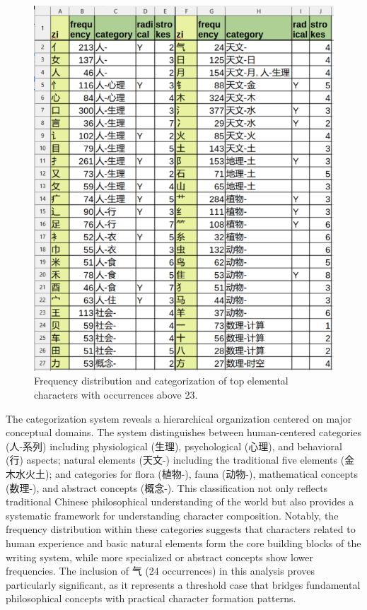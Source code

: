 \begin{figure}
\centering
\includegraphics{./images/top-elemental-zi-ENU.png}
\caption{Frequency distribution and categorization of top elemental
characters with occurrences above 23.}
\end{figure}

The categorization system reveals a hierarchical organization centered
on major conceptual domains. The system distinguishes between
human-centered categories (人-系列) including physiological (生理),
psychological (心理), and behavioral (行) aspects; natural elements
(天文-) including the traditional five elements (金木水火土); and
categories for flora (植物-), fauna (动物-), mathematical concepts
(数理-), and abstract concepts (概念-). This classification not only
reflects traditional Chinese philosophical understanding of the world
but also provides a systematic framework for understanding character
composition. Notably, the frequency distribution within these categories
suggests that characters related to human experience and basic natural
elements form the core building blocks of the writing system, while more
specialized or abstract concepts show lower frequencies. The inclusion
of 气 (24 occurrences) in this analysis proves particularly significant,
as it represents a threshold case that bridges fundamental philosophical
concepts with practical character formation patterns.

